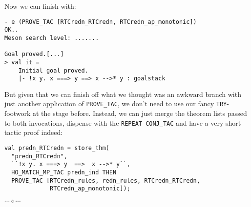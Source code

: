 \documentclass[12pt]{article}
\newcommand{\eos}{\hfill{}$\cdots\diamond\cdots$\hfill{}\vspace{5mm}}
\begin{document}
Now we can finish with:
\begin{session}\begin{verbatim}
- e (PROVE_TAC [RTCredn_RTCredn, RTCredn_ap_monotonic])
OK..
Meson search level: .......

Goal proved.[...]
> val it =
    Initial goal proved.
    |- !x y. x ===> y ==> x -->* y : goalstack
\end{verbatim}\end{session}
But given that we can finish off what we thought was an awkward branch
with just another application of \texttt{PROVE\_TAC}, we don't need to
use our fancy \texttt{TRY}-footwork at the stage before.  Instead, we
can just merge the theorem lists passed to both invocations, dispense
with the \texttt{REPEAT CONJ\_TAC} and have a very short tactic proof
indeed:
\begin{session}\begin{verbatim}
val predn_RTCredn = store_thm(
  "predn_RTCredn",
  ``!x y. x ===> y  ==>  x -->* y``,
  HO_MATCH_MP_TAC predn_ind THEN
  PROVE_TAC [RTCredn_rules, redn_rules, RTCredn_RTCredn,
             RTCredn_ap_monotonic]);
\end{verbatim}\end{session}
\eos{}
\end{document}
